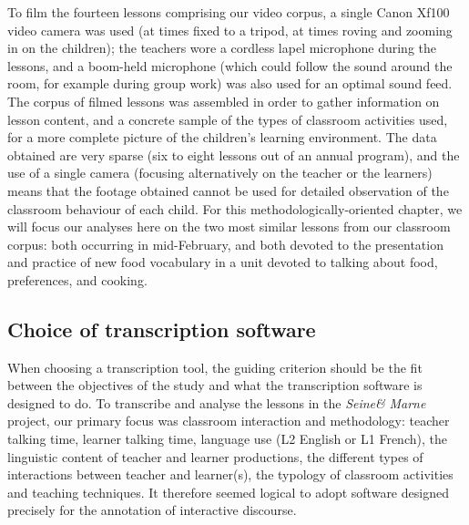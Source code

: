 \documentclass[output=paper,colorlinks,citecolor=brown,modfonts,nonflat]{../langscibook}
\begin{document}
To film the fourteen lessons comprising our video corpus, a single Canon Xf100 video camera was used (at times fixed to a tripod, at times roving and zooming in on the children); the teachers wore a cordless lapel microphone during the lessons, and a boom-held microphone (which could follow the sound around the room, for example during group work) was also used for an optimal sound feed. The corpus of filmed lessons was assembled in order to gather information on lesson content, and a concrete sample of the types of classroom activities used, for a more complete picture of the children’s learning environment. The data obtained are very sparse (six to eight lessons out of an annual program), and the use of a single camera (focusing alternatively on the teacher or the learners) means that the footage obtained cannot be used for detailed observation of the classroom behaviour of each child. For this methodologically-oriented chapter, we will focus our analyses here on the two most similar lessons from our classroom corpus: both occurring in mid-February, and both devoted to the presentation and practice of new food vocabulary in a unit devoted to talking about food, preferences, and cooking.

\subsection{Choice of transcription software}

When choosing a transcription tool, the guiding criterion should be the fit between the objectives of the study and what the transcription software is designed to do. To transcribe and analyse the lessons in the \textit{Seine\&} \textit{Marne} project, our primary focus was classroom interaction and methodology: teacher talking time, learner talking time, language use (L2 English or L1 French), the linguistic content of teacher and learner productions, the different types of interactions between teacher and learner(s), the typology of classroom activities and teaching techniques. It therefore seemed logical to adopt software designed precisely for the annotation of interactive discourse. 
\end{document}
